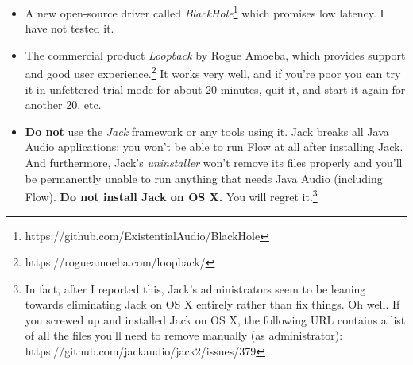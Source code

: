 \documentclass{article}
\newcommand\name{Flow}
\begin{document}
\begin{itemize}
\begin{itemize}
{\begin{enumerate}
\item Unpack the {\tt Soundflower-2.0b2.dmg} disk image.
\item In the terminal, type:
\begin{tabbing}
~\hspace{5em}{\tt cd /Volumes/Soundflower-2.0b2}\hspace{2in}\= {\it Then press RETURN}\\
~\hspace{5em}{\tt sudo installer -pkg Soundflower.pkg -target /}
\end{tabbing}
\item Enter your password and press RETURN.
\item When you're told that this has failed, go to ``Security and Privacy'' in System Preferences, and permit the software to load.  You may need to click "Allow...", then select ``MATT INGALLS'' (he's the developer) in the list and approve it.  Then do steps 2 and 3 again.
\item Wait a long time.  It takes quite a while to install for no good reason.
\item At this point, SoundFlower 2ch and 64ch will appear as audio devices.  You want SoundFlower 2ch.  You can configure it further in Audio MIDI Setup if you like, or just use it straight.
\end{enumerate}
}
which works well though with high latency.  
\item A new open-source driver called {\it BlackHole}\footnote{https:/\!/github.com/ExistentialAudio/BlackHole} which promises low latency.  I have not tested it.
\item The commercial product {\it Loopback} by Rogue Amoeba, which provides support and good user experience.\footnote{https:/\!/rogueamoeba.com/loopback/}  It works very well, and if you're poor you can try it in unfettered trial mode for about 20 minutes, quit it, and start it again for another 20, etc.   
\item {\bf Do not} use the {\it Jack} framework or any tools using it.  Jack breaks all Java Audio applications: you won't be able to run {\name} at all after installing Jack.  And furthermore, Jack's {\it uninstaller} won't remove its files properly and you'll be permanently unable to run anything that needs Java Audio (including {\name}).  {\color{red}\bf Do not install Jack on OS X.}  You will regret it.\footnote{In fact, after I reported this, Jack's administrators seem to be leaning towards eliminating Jack on OS X entirely rather than fix things.  Oh well.  If you screwed up and installed Jack on OS X, the following URL contains a list of all the files you'll need to remove manually (as administrator): https:/\!/github.com/jackaudio/jack2/issues/379}
\end{itemize}
\end{itemize}
\end{document}
